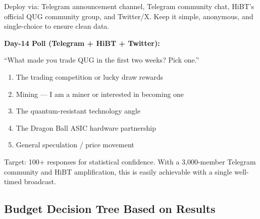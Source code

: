 \documentclass[11pt,a4paper]{article}
\begin{document}
Deploy via: Telegram announcement channel, Telegram community chat, HiBT's official QUG community group, and Twitter/X. Keep it simple, anonymous, and single-choice to ensure clean data.

\begin{tcolorbox}[graybox]
\textbf{Day-14 Poll (Telegram + HiBT + Twitter):}

\medskip
``What made you trade QUG in the first two weeks? Pick one.''

\medskip
\begin{enumerate}[leftmargin=1em, itemsep=2pt]
  \item The trading competition or lucky draw rewards
  \item Mining — I am a miner or interested in becoming one
  \item The quantum-resistant technology angle
  \item The Dragon Ball ASIC hardware partnership
  \item General speculation / price movement
\end{enumerate}
\end{tcolorbox}

Target: 100+ responses for statistical confidence. With a 3,000-member Telegram community and HiBT amplification, this is easily achievable with a single well-timed broadcast.

\subsection{Budget Decision Tree Based on Results}
\end{document}
